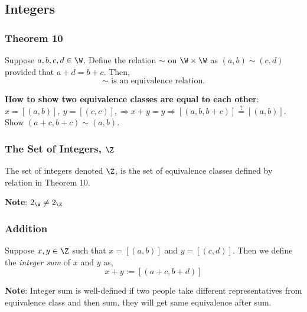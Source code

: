 \subsection{Integers}

    \subsubsection{Theorem 10}

            \begin{ntheorem}
               Suppose $a,b,c,d \in \W$. Define the relation $\sim$ on $\W \times \W$ as $(a,b) \sim (c,d)$ provided that $a + d = b + c$. Then, $$\sim \text{ is an equivalence relation}.$$ 
            \end{ntheorem}

            \textbf{How to show two equivalence classes are equal to each other}: \\
            $x = [(a,b)], \ y = [(c,c)], \Rightarrow  x + y = y \Rightarrow [(a,b, b + c)] \stackrel{?}{=} [(a,b)]$. Show $(a+c,b+c) \sim (a,b)$.

        \subsubsection{The Set of Integers, $\Z$}

            \begin{definition}
                The set of integers denoted $\Z$, is the set of equivalence classes defined by relation in Theorem 10.
            \end{definition}

            \noindent \textbf{Note}: $2_\W \ne 2_\Z$

        \subsubsection{Addition}

            \begin{definition}
                Suppose $x,y \in \Z$ such that $x=[(a,b)]$ and $y = [(c,d)]$. Then we define the \textit{integer sum} of $x$ and $y$ as, $$x + y := [(a + c, b + d)]$$
            \end{definition}

            \noindent \textbf{Note}: Integer sum is well-defined if two people take different representatives from equivalence class and then sum, they will get same equivalence after sum.

    \vspace{0.5cm}

